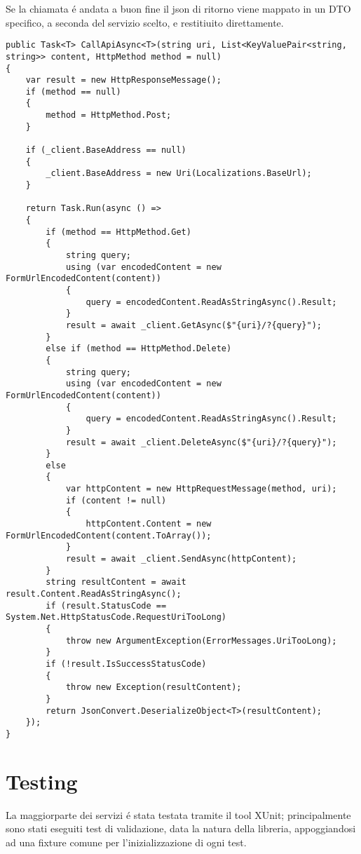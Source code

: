 Se la chiamata \'e andata a buon fine il json di ritorno viene mappato in un DTO specifico, a seconda del servizio scelto, e restitiuito direttamente.

\begin{lstlisting}[style=CSharpStyle]
public Task<T> CallApiAsync<T>(string uri, List<KeyValuePair<string, string>> content, HttpMethod method = null)
{
    var result = new HttpResponseMessage();
    if (method == null)
    {
        method = HttpMethod.Post;
    }

    if (_client.BaseAddress == null)
    {
        _client.BaseAddress = new Uri(Localizations.BaseUrl);
    }

    return Task.Run(async () =>
    {
        if (method == HttpMethod.Get)
        {
            string query;
            using (var encodedContent = new FormUrlEncodedContent(content))
            {
                query = encodedContent.ReadAsStringAsync().Result;
            }
            result = await _client.GetAsync($"{uri}/?{query}");
        }
        else if (method == HttpMethod.Delete)
        {
            string query;
            using (var encodedContent = new FormUrlEncodedContent(content))
            {
                query = encodedContent.ReadAsStringAsync().Result;
            }
            result = await _client.DeleteAsync($"{uri}/?{query}");
        }
        else
        {
            var httpContent = new HttpRequestMessage(method, uri);
            if (content != null)
            {
                httpContent.Content = new FormUrlEncodedContent(content.ToArray());
            }
            result = await _client.SendAsync(httpContent);
        }
        string resultContent = await result.Content.ReadAsStringAsync();
        if (result.StatusCode == System.Net.HttpStatusCode.RequestUriTooLong)
        {
            throw new ArgumentException(ErrorMessages.UriTooLong);
        }
        if (!result.IsSuccessStatusCode)
        {
            throw new Exception(resultContent); 
        }
        return JsonConvert.DeserializeObject<T>(resultContent);
    });
}
\end{lstlisting}

\section{Testing}
La maggiorparte dei servizi \'e stata testata tramite il tool XUnit; principalmente sono stati eseguiti test di validazione, data la natura della libreria, appoggiandosi 
ad una fixture comune per l'inizializzazione di ogni test.

